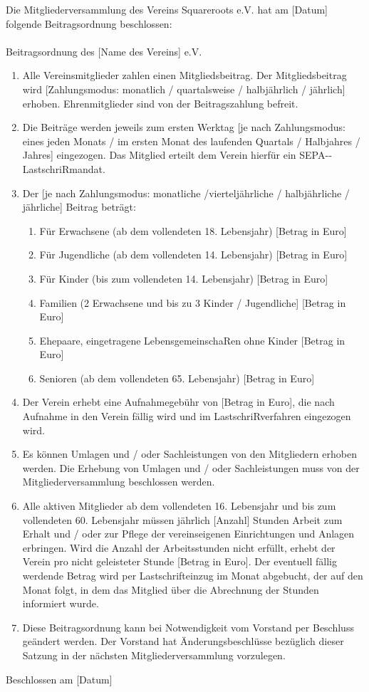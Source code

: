 \documentclass[a4paper,ngerman]{scrartcl}
\begin{document}
Die Mitgliederversammlung des Vereins Squareroots e.V. hat am [Datum] folgende Beitragsordnung beschlossen:
\\
\\
Beitragsordnung des [Name des Vereins] e.V.

\begin{enumerate}
\item Alle Vereinsmitglieder zahlen einen Mitgliedsbeitrag. Der Mitgliedsbeitrag wird [Zahlungsmodus: monatlich / quartalsweise / halbjährlich / jährlich] erhoben. Ehrenmitglieder sind von der Beitragszahlung befreit.
\item Die Beiträge werden jeweils zum ersten Werktag [je nach Zahlungsmodus: eines jeden Monats / im ersten Monat des laufenden Quartals / Halbjahres / Jahres] eingezogen. Das Mitglied erteilt dem Verein hierfür ein SEPA-­‐LastschriRmandat.
\item Der [je nach Zahlungsmodus: monatliche /vierteljährliche / halbjährliche / jährliche] Beitrag beträgt:
\begin{enumerate}
\item Für Erwachsene (ab dem vollendeten 18. Lebensjahr) [Betrag in Euro]
\item Für Jugendliche (ab dem vollendeten 14. Lebensjahr) [Betrag in Euro]
\item Für Kinder (bis zum vollendeten 14. Lebensjahr) [Betrag in Euro]
\item Familien (2 Erwachsene und bis zu 3 Kinder / Jugendliche] [Betrag in Euro]
\item Ehepaare, eingetragene LebensgemeinschaRen ohne Kinder [Betrag in Euro]
\item Senioren (ab dem vollendeten 65. Lebensjahr) [Betrag in Euro]
\end{enumerate}
\item Der Verein erhebt eine Aufnahmegebühr von [Betrag in Euro], die nach Aufnahme in den Verein fällig wird und im LastschriRverfahren eingezogen wird.
\item Es können Umlagen und / oder Sachleistungen von den Mitgliedern erhoben werden. Die Erhebung von Umlagen und / oder Sachleistungen muss von der Mitgliederversammlung beschlossen werden.
\item Alle aktiven Mitglieder ab dem vollendeten 16. Lebensjahr und bis zum vollendeten 60. Lebensjahr müssen jährlich [Anzahl] Stunden Arbeit zum Erhalt und / oder zur Pflege der vereinseigenen Einrichtungen und Anlagen erbringen. Wird die Anzahl der Arbeitsstunden nicht erfüllt, erhebt der Verein pro nicht geleisteter Stunde [Betrag in Euro]. Der eventuell fällig werdende Betrag wird per Lastschrifteinzug im Monat abgebucht, der auf den Monat folgt, in dem das Mitglied über die Abrechnung der Stunden informiert wurde.
\item Diese Beitragsordnung kann bei Notwendigkeit vom Vorstand per Beschluss geändert werden. Der Vorstand hat Änderungsbeschlüsse bezüglich dieser Satzung in der nächsten Mitgliederversammlung vorzulegen.
\end{enumerate}


Beschlossen am [Datum]
\end{document}

